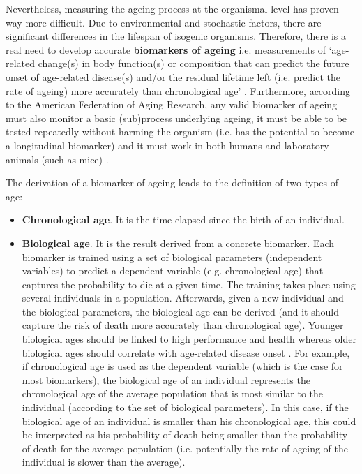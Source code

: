 \bigskip

Nevertheless, measuring the ageing process at the organismal level has proven way more difficult. Due to environmental and stochastic factors, there are significant differences in the lifespan of isogenic organisms. Therefore, there is a real need to develop accurate \textbf{biomarkers of ageing} i.e. measurements of `age-related change(s) in body function(s) or composition that can predict the future onset of age-related disease(s) and/or the residual lifetime left (i.e. predict the rate of ageing) more accurately than chronological age' \cite{Burkle2015a}. Furthermore, according to the American Federation of Aging Research, any valid biomarker of ageing must also monitor a basic (sub)process underlying ageing, it must be able to be tested repeatedly without harming the organism (i.e. has the potential to become a longitudinal biomarker) and it must work in both humans and laboratory animals (such as mice) \cite{Burkle2015a}.

\bigskip

The derivation of a biomarker of ageing leads to the definition of two types of age:

\begin{itemize}
	
	\item \textbf{Chronological age}. It is the time elapsed since the birth of an individual.
	
	\item \textbf{Biological age}. It is the result derived from a concrete biomarker. Each biomarker is trained using a set of biological parameters (independent variables) to predict a dependent variable (e.g. chronological age) that captures the probability to die at a given time. The training takes place using several individuals in a population. Afterwards, given a new individual and the biological parameters, the biological age can be derived (and it should capture the risk of death more accurately than chronological age). Younger biological ages should be linked to high performance and health whereas older biological ages should correlate with age-related disease onset \cite{Benayoun2015a}. For example, if chronological age is used as the dependent variable (which is the case for most biomarkers), the biological age of an individual represents the chronological age of the average population that is most similar to the individual (according to the set of biological parameters). In this case, if the biological age of an individual is smaller than his chronological age, this could be interpreted as his probability of death being smaller than the probability of death for the average population (i.e. potentially the rate of ageing of the individual is slower than the average). 
	
\end{itemize}

